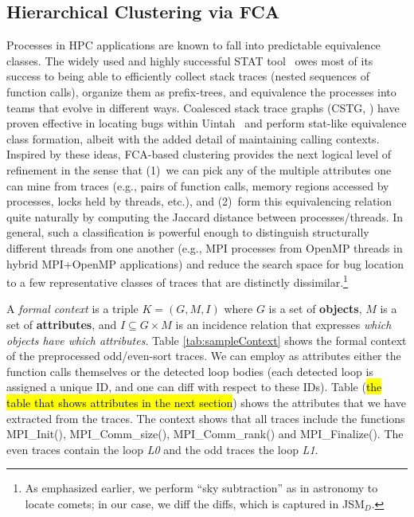 \subsection{Hierarchical Clustering via FCA}
Processes in HPC applications are known to fall into predictable equivalence classes.
%
The widely used and highly successful STAT tool~\cite{stat} owes most of its
success to being able to efficiently collect stack traces (nested sequences of function
calls), organize them as prefix-trees, and equivalence the processes into teams that
evolve in different ways.
%
Coalesced stack trace graphs (CSTG, \cite{cstg-journal-paper}) have proven effective in
locating bugs within Uintah~\cite{uintah} and perform stat-like equivalence class formation,
albeit with the added detail of maintaining calling contexts.
%
Inspired by these ideas, FCA-based clustering provides the next logical level of refinement
in the sense that (1)~we can pick any of the multiple attributes one can mine from traces (e.g.,
pairs of function calls, memory regions accessed by processes, locks held by threads, etc.), and (2)~form this equivalencing relation quite naturally by computing the Jaccard distance between processes/threads.
%
In general,
such a classification is powerful enough to
distinguish structurally different threads from one another
(e.g., MPI processes from OpenMP threads in hybrid MPI+OpenMP applications)
and reduce the search space for bug location to a few representative classes of traces that
are distinctly dissimilar.\footnote{As emphasized earlier, we perform ``sky subtraction'' as
  in astronomy to locate comets; in our case, we diff the diffs, which is
  captured in JSM$_{D}$.}

A \textit{formal context} is a triple $K = (G, M, I)$
where $G$ is a set of \textbf{objects},
$M$ is a set of \textbf{attributes},
and $I \subseteq G \times M$ is an incidence relation that expresses
\textit{which objects have which attributes}.
Table \ref{tab:sampleContext} shows the formal context of the preprocessed odd/even-sort traces.
%
We can employ as attributes either the function calls themselves or the detected loop bodies
(each detected loop is assigned a unique ID, and one can diff with respect to these IDs).
%
Table (\hl{the table that shows attributes in the next section})
shows the attributes that we have extracted from the traces.
The context shows that all traces include the functions MPI\_Init(),
MPI\_Comm\_size(), MPI\_Comm\_rank() and MPI\_Finalize().
The even traces contain the loop \textit{L0} and the odd traces the loop \textit{L1}.
%

